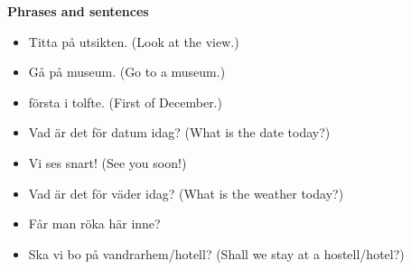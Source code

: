 
\begin{flushleft}
    \textbf{Phrases and sentences}
    \begin{itemize}
        \item Titta på utsikten. (Look at the view.)
        \item Gå på museum. (Go to a museum.)
        \item första i tolfte. (First of December.)
        \item Vad är det för datum idag? (What is the date today?)
        \item Vi ses snart! (See you soon!)
        \item Vad är det för väder idag? (What is the weather today?)
        \item Får man röka här inne?
        \item Ska vi bo på vandrarhem/hotell? (Shall we stay at a hostell/hotel?)
    \end{itemize}
\end{flushleft}

